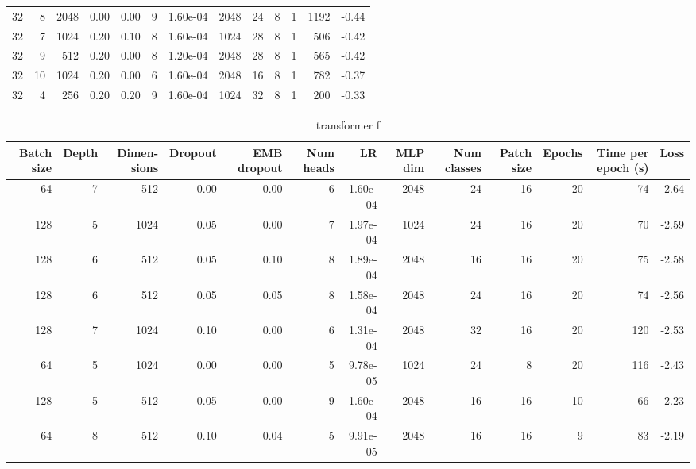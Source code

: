 \begin{appendices}
\begin{table}
\begin{tabular}{rrrrrrrrrrrrr}
32 & 8 & 2048 & 0.00 & 0.00 & 9 & 1.60e-04 & 2048 & 24 & 8 & 1 & 1192 & -0.44 \\
32 & 7 & 1024 & 0.20 & 0.10 & 8 & 1.60e-04 & 1024 & 28 & 8 & 1 & 506 & -0.42 \\
32 & 9 & 512 & 0.20 & 0.00 & 8 & 1.20e-04 & 2048 & 28 & 8 & 1 & 565 & -0.42 \\
32 & 10 & 1024 & 0.20 & 0.00 & 6 & 1.60e-04 & 2048 & 16 & 8 & 1 & 782 & -0.37 \\
32 & 4 & 256 & 0.20 & 0.20 & 9 & 1.60e-04 & 1024 & 32 & 8 & 1 & 200 & -0.33 \\
\bottomrule
\end{tabular}
\end{table}

\begin{table}
\caption{transformer f}
\begin{tabular}{rrrrrrrrrrrrr}
\toprule
\multicolumn{1}{p{0.5cm}}{\raggedleft Batch size} & 
\multicolumn{1}{p{0.5cm}}{\raggedleft Depth} & 
\multicolumn{1}{p{1.0cm}}{\raggedleft Dimen-sions} & 
\multicolumn{1}{p{1.0cm}}{\raggedleft Dropout} & 
\multicolumn{1}{p{1.0cm}}{\raggedleft EMB dropout} & 
\multicolumn{1}{p{1.0cm}}{\raggedleft Num heads} & 
\multicolumn{1}{p{0.5cm}}{\raggedleft LR} & 
\multicolumn{1}{p{0.5cm}}{\raggedleft MLP dim} & 
\multicolumn{1}{p{1.0cm}}{\raggedleft Num classes} & 
\multicolumn{1}{p{1.0cm}}{\raggedleft Patch size} & 
\multicolumn{1}{p{1.0cm}}{\raggedleft Epochs} & 
\multicolumn{1}{p{1.5cm}}{\raggedleft Time per epoch (s)} & 
\multicolumn{1}{p{0.5cm}}{\raggedleft Loss} \\
\midrule
64 & 7 & 512 & 0.00 & 0.00 & 6 & 1.60e-04 & 2048 & 24 & 16 & 20 & 74 & -2.64 \\
128 & 5 & 1024 & 0.05 & 0.00 & 7 & 1.97e-04 & 1024 & 24 & 16 & 20 & 70 & -2.59 \\
128 & 6 & 512 & 0.05 & 0.10 & 8 & 1.89e-04 & 2048 & 16 & 16 & 20 & 75 & -2.58 \\
128 & 6 & 512 & 0.05 & 0.05 & 8 & 1.58e-04 & 2048 & 24 & 16 & 20 & 74 & -2.56 \\
128 & 7 & 1024 & 0.10 & 0.00 & 6 & 1.31e-04 & 2048 & 32 & 16 & 20 & 120 & -2.53 \\
64 & 5 & 1024 & 0.00 & 0.00 & 5 & 9.78e-05 & 1024 & 24 & 8 & 20 & 116 & -2.43 \\
128 & 5 & 512 & 0.05 & 0.00 & 9 & 1.60e-04 & 2048 & 16 & 16 & 10 & 66 & -2.23 \\
64 & 8 & 512 & 0.10 & 0.04 & 5 & 9.91e-05 & 2048 & 16 & 16 & 9 & 83 & -2.19 \\

\end{tabular}
\end{table}
\end{appendices}
